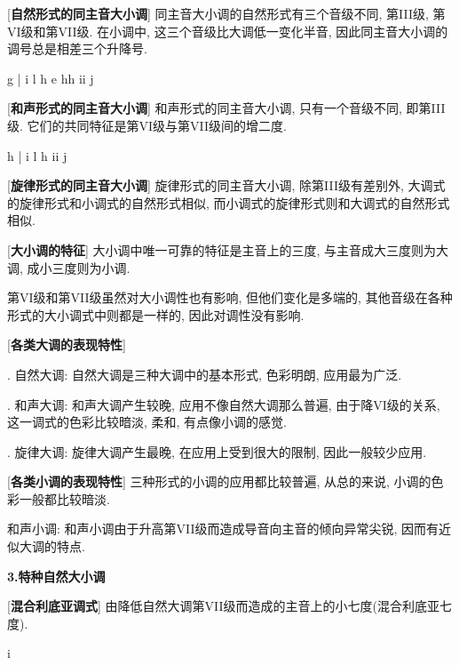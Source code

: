 [\textbf{自然形式的同主音大小调}] 同主音大小调的自然形式有三个音级不同, 第III级, 第VI级和第VII级. 在小调中, 这三个音级比大调低一变化半音, 因此同主音大小调的调号总是相差三个升降号.\par
\startextract
\Notes {}\wh g  \en\bar
\Notes \fl i \fl l \fl h  \fl e \fl h\wh h \fl i\wh i \wh j \en
\zendextract

[\textbf{和声形式的同主音大小调}] 和声形式的同主音大小调, 只有一个音级不同, 即第III级. 它们的共同特征是第VI级与第VII级间的增二度. \par
\startextract
\Notes {} \fl h \en\bar
\Notes \fl i \fl l \fl h  \na i\wh i \wh j\en
\zendextract

[\textbf{旋律形式的同主音大小调}] 旋律形式的同主音大小调, 除第III级有差别外, 大调式的旋律形式和小调式的自然形式相似, 而小调式的旋律形式则和大调式的自然形式相似. \par

[\textbf{大小调的特征}] 大小调中唯一可靠的特征是主音上的三度, 与主音成大三度则为大调, 成小三度则为小调. \par
\qquad 第VI级和第VII级虽然对大小调性也有影响, 但他们变化是多端的, 其他音级在各种形式的大小调式中则都是一样的, 因此对调性没有影响.\par

[\textbf{各类大调的表现特性}] \par
{}. 自然大调: 自然大调是三种大调中的基本形式, 色彩明朗, 应用最为广泛.\par
{}. 和声大调: 和声大调产生较晚, 应用不像自然大调那么普遍, 由于降VI级的关系, 这一调式的色彩比较暗淡, 柔和, 有点像小调的感觉.\par
{}. 旋律大调: 旋律大调产生最晚, 在应用上受到很大的限制, 因此一般较少应用. \par

[\textbf{各类小调的表现特性}] 三种形式的小调的应用都比较普遍, 从总的来说, 小调的色彩一般都比较暗淡. \par
\qquad 和声小调: 和声小调由于升高第VII级而造成导音向主音的倾向异常尖锐, 因而有近似大调的特点. \par

\clearpage

\begin{center}
 \textbf{3.特种自然大小调}\\
\end{center}

[\textbf{混合利底亚调式}] 由降低自然大调第VII级而造成的主音上的小七度(混合利底亚七度). \par
\startextract
\Notes {} \fl i \en
\zendextract


